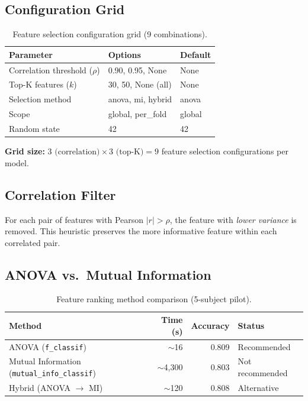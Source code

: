 \subsection{Configuration Grid}

\begin{table}[h]
\centering
\caption{Feature selection configuration grid (9 combinations).}
\label{tab:fs_grid}
\begin{tabular}{l l l}
\toprule
\textbf{Parameter} & \textbf{Options} & \textbf{Default} \\
\midrule
Correlation threshold ($\rho$)  & 0.90, 0.95, None     & None \\
Top-K features ($k$)            & 30, 50, None (all)    & None \\
Selection method                & anova, mi, hybrid     & anova \\
Scope                           & global, per\_fold     & global \\
Random state                    & 42                    & 42 \\
\bottomrule
\end{tabular}
\end{table}

\textbf{Grid size:} $3 \text{ (correlation)} \times 3 \text{ (top-K)} = 9$ feature selection configurations per model.

\subsection{Correlation Filter}

For each pair of features with Pearson $|r| > \rho$, the feature with \emph{lower variance} is removed. This heuristic preserves the more informative feature within each correlated pair.

\subsection{ANOVA vs.\ Mutual Information}

\begin{table}[h]
\centering
\caption{Feature ranking method comparison (5-subject pilot).}
\label{tab:anova_vs_mi}
\begin{tabular}{l r r l}
\toprule
\textbf{Method} & \textbf{Time (s)} & \textbf{Accuracy} & \textbf{Status} \\
\midrule
ANOVA (\texttt{f\_classif})           & $\sim$16    & 0.809 & Recommended \\
Mutual Information (\texttt{mutual\_info\_classif}) & $\sim$4{,}300 & 0.803 & Not recommended \\
Hybrid (ANOVA $\rightarrow$ MI)       & $\sim$120   & 0.808 & Alternative \\
\bottomrule
\end{tabular}
\end{table}

